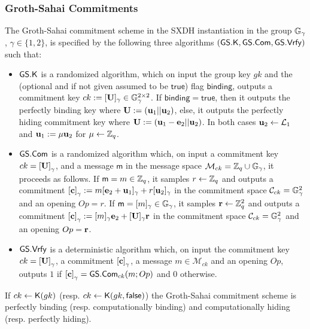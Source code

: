 \subsubsection{Groth-Sahai Commitments}

\begin{definition} The Groth-Sahai commitment scheme in the SXDH instantiation in the group $\mathbb{G}_\gamma$, $\gamma\in\{1,2\}$, is  specified by the following three algorithms 
	$(\mathsf{GS}.\mathsf{K},\mathsf{GS}.\mathsf{Com},\mathsf{GS}.\mathsf{Vrfy})$ such that:
	\begin{itemize} 
		\item  $\mathsf{GS}.\mathsf{K}$ is a randomized algorithm, which on input the group key $gk$ and the (optional and if not given assumed to be $\mathsf{true}$) flag $\mathsf{binding}$, outputs a commitment key $ck:=[\mathbf{{U}}]_\gamma\in\mathbb{G}_\gamma^{2\times 2}$. If $\mathsf{binding}=\mathsf{true}$, then it outputs the {perfectly binding key} where $\mathbf{{U}}:=(\mathbf{u}_1||\mathbf{u}_2)$, else, it outputs the {perfectly hiding commitment key} where $\mathbf{{U}}:=(\mathbf{u}_1-\mathbf{e}_2||\mathbf{u}_2)$. In both cases $\mathbf{u}_2\gets\mathcal{L}_{1}$ and $\mathbf{u}_1:=\mu\mathbf{u}_2$ for $\mu\gets\mathbb{Z}_q$.
		\item $\mathsf{GS}.\mathsf{Com}$ is a randomized algorithm which, on input a commitment key $ck=\left[\mathbf{{U}}\right]_\gamma$, and a message 
		$\mathsf{m}$ in the message space $\mathcal{M}_{ck}=\mathbb{Z}_q\cup\mathbb{G}_\gamma$, it proceeds as follows. If $\mathsf{m}=m\in\mathbb{Z}_q$, it samples $r \gets \mathbb{Z}_q$ and outputs a commitment $\left[\mathbf{c}\right]_\gamma := m[\mathbf{e}_2+\mathbf{u}_1]_\gamma+r[\mathbf{u}_2]_\gamma$ in the commitment space $\mathcal{C}_{ck}=\mathbb{G}_\gamma^2$ and an opening $Op=r$. If $\mathsf{m}=[m]_\gamma\in\mathbb{G}_\gamma$, it samples $\mathbf{r} \gets \mathbb{Z}_q^2$ and outputs a commitment $\left[\mathbf{c}\right]_\gamma := [m]_\gamma\mathbf{e}_2+[\mathbf{{U}}]_\gamma\mathbf{r}$ in the commitment space $\mathcal{C}_{ck}=\mathbb{G}_\gamma^2$ and an opening $Op=\mathbf{r}$.
		\item $\mathsf{GS}.\mathsf{Vrfy}$ is a deterministic algorithm which, on input the commitment key $ck=\left[\mathbf{{U}}\right]_\gamma$, a commitment $\left[\mathbf{c}\right]_\gamma$,  a message 
		$m \in \mathcal{M}_{ck}$ and an opening $Op$, outputs $1$ if $\left[\mathbf{c}\right]_\gamma={\mathsf{GS}}.\mathsf{Com}_{ck}(m;Op)$
		and $0$ otherwise.
	\end{itemize}
\end{definition}

\begin{theorem} If $ck\gets\mathsf{K}(gk)$ (resp. $ck\gets\mathsf{K}(gk,\mathsf{false})$) the Groth-Sahai commitment scheme is perfectly binding (resp. computationally binding) and computationally hiding (resp. perfectly hiding).
\end{theorem}

